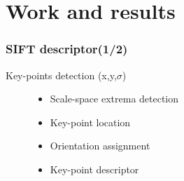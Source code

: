 \documentclass[xcolor=table]{beamer}
\begin{document}


\section{Work and results}
\begin{frame} \frametitle{SIFT descriptor(1/2)}


Key-points detection (x,y,$\sigma$)


\begin{figure}[htbp]
    \begin{minipage}[c]{.45\linewidth}
      \begin{itemize}

    \item Scale-space extrema detection\\


    \item  Key-point location\\


    \item Orientation assignment\\


    \item Key-point descriptor


\end{itemize}
\end{minipage}
\end{figure}
\end{frame}
\end{document}
